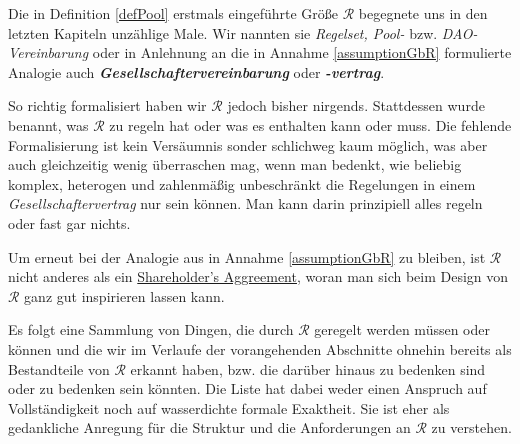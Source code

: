 
Die in Definition \ref{defPool} erstmals eingeführte Größe $\mathcal{R}$ begegnete uns in den letzten Kapiteln unzählige Male. Wir nannten sie \textit{Regelset, Pool-} bzw. \textit{DAO-Vereinbarung} oder in Anlehnung an die in Annahme \ref{assumptionGbR} formulierte Analogie auch \textbf{\textit{Gesellschaftervereinbarung}} oder \textbf{\textit{-vertrag}}. 

\vspace{0.1cm}

So richtig formalisiert haben wir $\mathcal{R}$ jedoch bisher nirgends. Stattdessen wurde benannt, was $\mathcal{R}$ zu regeln hat oder was es enthalten kann oder muss. Die fehlende Formali\-sierung ist kein Versäumnis sonder schlichweg kaum möglich, was aber auch gleich\-zeitig wenig überraschen mag, wenn man bedenkt, wie beliebig komplex, heterogen und zahlenmäßig unbeschränkt die Regelungen in einem \textit{Gesellschaftervertrag} nur sein können. Man kann darin prinzipiell alles regeln oder fast gar nichts.

Um erneut bei der Analogie aus in Annahme \ref{assumptionGbR} zu bleiben, ist $\mathcal{R}$ nicht anderes als ein \href{https://en.wikipedia.org/wiki/Shareholders'_agreement}{Shareholder's Aggreement}, woran man sich beim Design von $\mathcal{R}$ ganz gut inspirieren lassen kann.

Es folgt eine Sammlung von Dingen, die durch $\mathcal{R}$ geregelt werden müssen oder können und die wir im Verlaufe der vorangehenden Abschnitte ohnehin bereits als Bestandteile von $\mathcal{R}$ erkannt haben, bzw. die darüber hinaus zu bedenken sind oder zu bedenken sein könnten. Die Liste hat dabei weder einen Anspruch auf Vollständigkeit noch auf wasserdichte formale Exaktheit. Sie ist eher als gedankliche Anregung für die Struktur und die Anforderungen an $\mathcal{R}$ zu verstehen.



